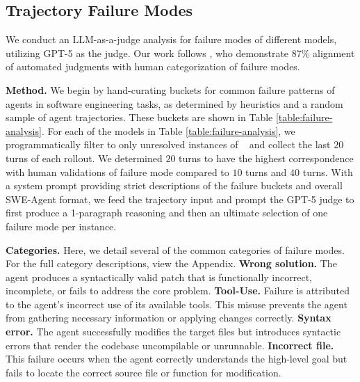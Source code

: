 \subsection{Trajectory Failure Modes}

We conduct an LLM-as-a-judge analysis for failure modes of different models, utilizing \textsc{GPT-5} as the judge. Our work follows \citet{yang2024sweagent}, who demonstrate 87\% alignment of automated judgments with human categorization of failure modes. 

\textbf{Method.} We begin by hand-curating buckets for common failure patterns of agents in software engineering tasks, as determined by heuristics and a random sample of agent trajectories. These buckets are shown in Table \ref{table:failure-analysis}. For each of the models in Table \ref{table:failure-analysis}, we programmatically filter to only unresolved instances of \benchmarkname~ and collect the last $20$ turns of each rollout. We determined $20$ turns to have the highest correspondence with human validations of failure mode compared to $10$ turns and $40$ turns. With a system prompt providing strict descriptions of the failure buckets and overall SWE-Agent format, we feed the trajectory input and prompt the GPT-5 judge to first produce a 1-paragraph reasoning and then an ultimate selection of one failure mode per instance.

\textbf{Categories.} Here, we detail several of the common categories of failure modes. For the full category descriptions, view the Appendix. \textbf{Wrong solution.} The agent produces a syntactically valid patch that is functionally incorrect, incomplete, or fails to address the core problem. \textbf{Tool-Use.} Failure is attributed to the agent's incorrect use of its available tools. This misuse prevents the agent from gathering necessary information or applying changes correctly. \textbf{Syntax error.} The agent successfully modifies the target files but introduces syntactic errors that render the codebase uncompilable or unrunnable. \textbf{Incorrect file.} This failure occurs when the agent correctly understands the high-level goal but fails to locate the correct source file or function for modification.

